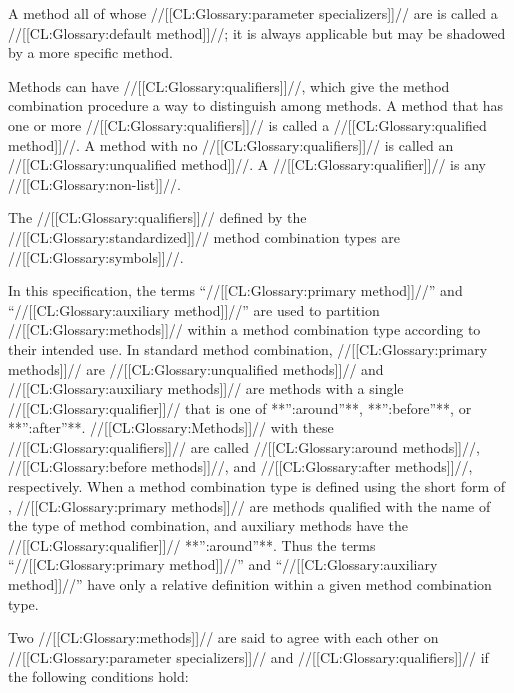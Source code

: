 A method all of whose //[[CL:Glossary:parameter specializers]]// are   is called a //[[CL:Glossary:default method]]//; it is always applicable but may be shadowed by a more specific method.

Methods can have //[[CL:Glossary:qualifiers]]//, which give the method combination procedure a way to distinguish among methods.  A method that has one or more //[[CL:Glossary:qualifiers]]// is called a //[[CL:Glossary:qualified method]]//. A method with no //[[CL:Glossary:qualifiers]]// is called an //[[CL:Glossary:unqualified method]]//.  A //[[CL:Glossary:qualifier]]// is any //[[CL:Glossary:non-list]]//.

The //[[CL:Glossary:qualifiers]]// defined by the //[[CL:Glossary:standardized]]// method combination types  are //[[CL:Glossary:symbols]]//.

In this specification, the terms ``//[[CL:Glossary:primary method]]//'' and  ``//[[CL:Glossary:auxiliary method]]//'' are used to partition //[[CL:Glossary:methods]]// within a method combination type according to their intended use.   In standard method combination, //[[CL:Glossary:primary methods]]// are  //[[CL:Glossary:unqualified methods]]//  and //[[CL:Glossary:auxiliary methods]]// are methods with a single //[[CL:Glossary:qualifier]]//  that is one of **'':around''**, **'':before''**, or **'':after''**. //[[CL:Glossary:Methods]]// with these //[[CL:Glossary:qualifiers]]// are called //[[CL:Glossary:around methods]]//, //[[CL:Glossary:before methods]]//, and //[[CL:Glossary:after methods]]//, respectively. When a method combination type is defined using the short form of , //[[CL:Glossary:primary methods]]// are  methods qualified with the name of the type of method combination,  and auxiliary methods have the //[[CL:Glossary:qualifier]]// **'':around''**. Thus the terms ``//[[CL:Glossary:primary method]]//'' and ``//[[CL:Glossary:auxiliary method]]//'' have only a relative definition within a given method combination type.

\endSubsection%

 

Two //[[CL:Glossary:methods]]// are said to agree with each other on //[[CL:Glossary:parameter specializers]]// and //[[CL:Glossary:qualifiers]]// if the following conditions hold:

\beginlist

